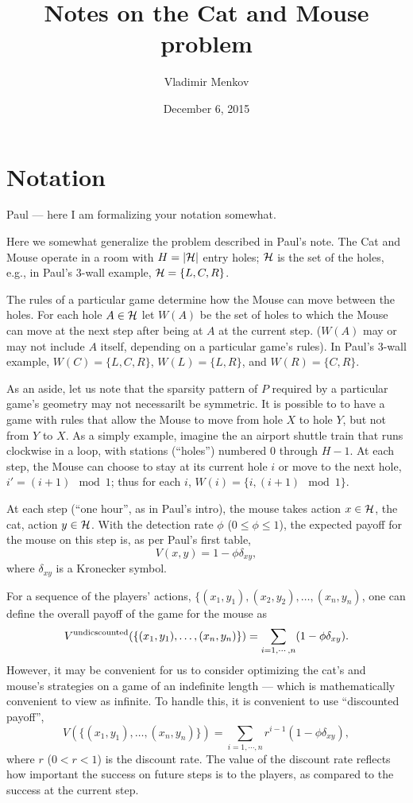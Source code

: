 \documentclass[12pt]{article}
\begin{document}
\title{Notes on the Cat and Mouse problem}
\date{December 6, 2015}
\author{Vladimir Menkov}

\maketitle

\section{Notation}
\label{sec:notation}

Paul --- here I am formalizing your notation somewhat.

Here we somewhat generalize the problem described in Paul's note. The Cat and Mouse operate in a room with $H=|\cal{H}|$ entry holes; $\cal{H}$ is the set of the holes, e.g., in Paul's 3-wall example, ${\cal{H}}=\{L,C,R\}$.

The rules of a particular game determine how the Mouse can move between the holes.  For each hole $A\in \cal{H}$ let  $W(A)$ be the set of holes to which the Mouse can move at the next step after being at $A$ at the current step. ($W(A)$ may or may not include $A$ itself, depending on a particular game's rules). In Paul's 3-wall example, $W(C)=\{L,C,R\}$, $W(L)=\{L,R\}$, and $W(R)=\{C,R\}$.

As an aside, let us note that the sparsity pattern of $P$ required by a particular game's geometry may not necessarilt be symmetric. It is possible to to have a game with rules that allow the Mouse to move from hole $X$ to hole $Y$, but not from $Y$ to $X$. As a simply example, imagine the an airport shuttle train that runs clockwise in a loop, with stations (``holes'') numbered 0 through $H-1$. At each step, the Mouse can choose to stay at its current hole $i$ or move to the next hole, $i' = (i+1) \mod 1$; thus for each $i$, $W(i)=\{i, (i+1) \mod 1\}$.

At each step (``one hour'', as in Paul's intro), the mouse takes action $x\in\cal{H}$, the cat, action  $y\in\cal{H}$. With the detection rate $\phi$ ($0\le\phi\le 1$), the expected payoff for the mouse on this step is, as per Paul's first table, 
$$
V(x,y)=1 - \phi \delta_{xy},
$$
where $\delta_{xy}$ is a Kronecker symbol.    

For a sequence of the players' actions, $\{(x_1,y_1), (x_2,y_2), \ldots, (x_n,y_n)$, one can define the overall payoff of the game for the mouse as
$$
V^{\rm{undicscounted}}(\{(x_1,y_1),  \ldots, (x_n,y_n)\}) =
\sum_{i=1,\cdots,n} (1 - \phi \delta_{xy}).
$$
However, it may be convenient for us to consider optimizing the cat's and mouse's strategies on a game of an indefinite length --- which is mathematically convenient to view as infinite. To handle this, it is convenient to use ``discounted payoff'',
$$
V(\{(x_1,y_1),  \ldots, (x_n,y_n)\}) =
\sum_{i=1,\cdots,n} r^{i-1} (1 - \phi \delta_{xy}),
$$
where $r$ ($0<r<1$) is the discount rate. The value of the discount rate reflects how important the success on future steps is to the players, as compared to the success at the current step.
\end{document}
